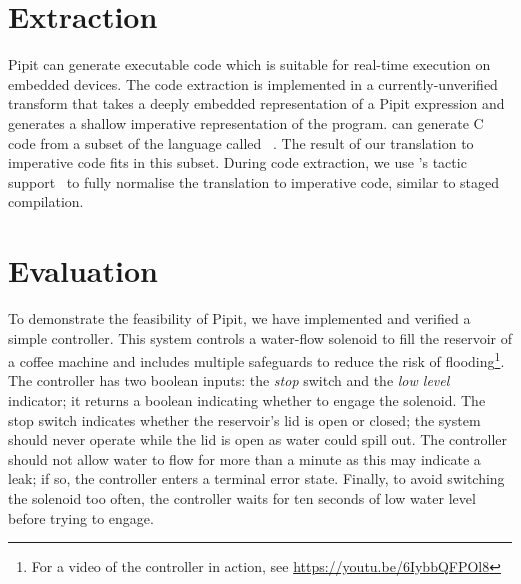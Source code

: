 \documentclass[sigplan,screen, review]{acmart}
\begin{document}
\section{Extraction}
\label{s:extraction}

Pipit can generate executable code which is suitable for real-time execution on embedded devices.
The code extraction is implemented in a currently-unverified transform that takes a deeply embedded representation of a Pipit expression and generates a shallow imperative representation of the program.
\fstar{} can generate C code from a subset of the language called \lowstar{}~\cite{protzenko2017verified}.
The result of our translation to imperative code fits in this subset.
During code extraction, we use \fstar{}'s tactic support~\cite{martinez2019meta} to fully normalise the translation to imperative code, similar to staged compilation.






\section{Evaluation}
\label{s:coffee-machine}

To demonstrate the feasibility of Pipit, we have implemented and verified a simple controller.
This system controls a water-flow solenoid to fill the reservoir of a coffee machine and includes multiple safeguards to reduce the risk of flooding\footnote{For a video of the controller in action, see \url{https://youtu.be/6IybbQFPOl8}}.
The controller has two boolean inputs: the \emph{stop} switch and the \emph{low level} indicator; it returns a boolean indicating whether to engage the solenoid.
The stop switch indicates whether the reservoir's lid is open or closed; the system should never operate while the lid is open as water could spill out.
The controller should not allow water to flow for more than a minute as this may indicate a leak; if so, the controller enters a terminal error state.
Finally, to avoid switching the solenoid too often, the controller waits for ten seconds of low water level before trying to engage.
\end{document}
